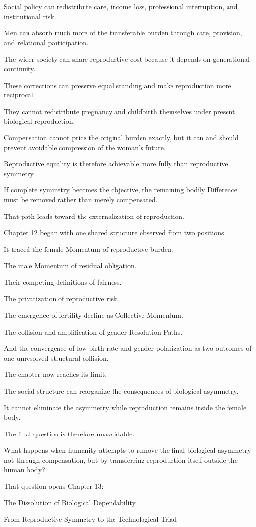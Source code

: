 Social policy can redistribute care, income loss, professional interruption, and institutional risk.

Men can absorb much more of the transferable burden through care, provision, and relational participation.

The wider society can share reproductive cost because it depends on generational continuity.

These corrections can preserve equal standing and make reproduction more reciprocal.

They cannot redistribute pregnancy and childbirth themselves under present biological reproduction.

Compensation cannot price the original burden exactly, but it can and should prevent avoidable compression of the woman’s future.

Reproductive equality is therefore achievable more fully than reproductive symmetry.

If complete symmetry becomes the objective, the remaining bodily Difference must be removed rather than merely compensated.

That path leads toward the externalization of reproduction.

Chapter 12 began with one shared structure observed from two positions.

It traced the female Momentum of reproductive burden.

The male Momentum of residual obligation.

Their competing definitions of fairness.

The privatization of reproductive risk.

The emergence of fertility decline as Collective Momentum.

The collision and amplification of gender Resolution Paths.

And the convergence of low birth rate and gender polarization as two outcomes of one unresolved structural collision.

The chapter now reaches its limit.

The social structure can reorganize the consequences of biological asymmetry.

It cannot eliminate the asymmetry while reproduction remains inside the female body.

The final question is therefore unavoidable:

What happens when humanity attempts to remove the final biological asymmetry not through compensation, but by transferring reproduction itself outside the human body?

That question opens Chapter 13:

The Dissolution of Biological Dependability

From Reproductive Symmetry to the Technological Triad
